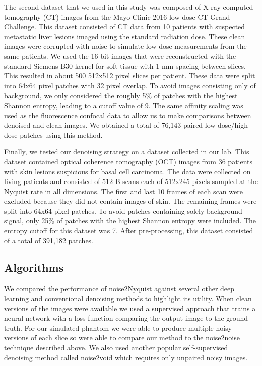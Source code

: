 \documentclass[journal,twoside,web]{ieeecolor}
\begin{document}
The second dataset that we used in this study was composed of X-ray computed tomography (CT) images from the Mayo Clinic 2016 low-dose CT Grand Challenge\cite{McCollough2017}. This dataset consisted of CT data from 10 patients with suspected metastatic liver lesions imaged using the standard radiation dose. These clean images were corrupted with noise to simulate low-dose measurements from the same patients. We used the 16-bit images that were reconstructed with the standard Siemens B30 kernel for soft tissue with 1 mm spacing between slices. This resulted in about 500 512x512 pixel slices per patient. These data were split into 64x64 pixel patches with 32 pixel overlap. To avoid images consisting only of background, we only considered the roughly 5\% of patches with the highest Shannon entropy, leading to a cutoff value of 9. The same affinity scaling was used as the fluorescence confocal data to allow us to make comparisons between denoised and clean images. We obtained a total of 76,143 paired low-dose/high-dose patches using this method. 

Finally, we tested our denoising strategy on a dataset collected in our lab. This dataset contained optical coherence tomography (OCT) images from 36 patients with skin lesions suspicious for basal cell carcinoma. The data were collected on living patients and consisted of 512 B-scans each of 512x245 pixels sampled at the Nyquist rate in all dimensions\cite{Iftimia2017a}. The first and last 10 frames of each scan were excluded because they did not contain images of skin. The remaining frames were split into 64x64 pixel patches. To avoid patches containing solely background signal, only 25\% of patches with the highest Shannon entropy were included. The entropy cutoff for this dataset was 7. After pre-processing, this dataset consisted of a total of 391,182 patches. 

\subsection{Algorithms}
We compared the performance of noise2Nyquist against several other deep learning and conventional denoising methods to highlight its utility. When clean versions of the images were available we used a supervised approach that trains a neural network with a loss function comparing the output image to the ground truth. For our simulated phantom we were able to produce multiple noisy versions of each slice so were able to compare our method to the noise2noise technique described above. We also used another popular self-supervised denoising method called noise2void\cite{Krull2019} which requires only unpaired noisy images.
\end{document}
